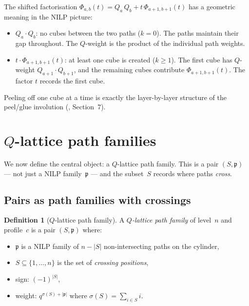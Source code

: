 \documentclass[11pt]{article}
\theoremstyle{plain}
\theoremstyle{definition}
\newtheorem{definition}[theorem]{Definition}
\begin{document}
The shifted factorisation
$\Phi_{a,b}(t) = Q_a\, Q_b + t\,\Phi_{a+1,b+1}(t)$
has a geometric meaning in the NILP picture:
\begin{itemize}
  \item $Q_a \cdot Q_b$: no cubes between the two paths
    ($k = 0$).  The paths maintain their gap throughout.
    The $Q$-weight is the product of the individual
    path weights.
  \item $t \cdot \Phi_{a+1,b+1}(t)$: at least one cube is
    created ($k \geq 1$).  The first cube has
    $Q$-weight $Q_{a+1} \cdot Q_{b+1}$, and the remaining
    cubes contribute $\Phi_{a+1,b+1}(t)$.  The factor
    $t$ records the first cube.
\end{itemize}
Peeling off one cube at a time is exactly the layer-by-layer
structure of the peel/glue involution
(\cite{LOCAL_RULE}, Section~7).


\section{$Q$-lattice path families}
\label{sec:Q-families}

We now define the central object: a $Q$-lattice path family.
This is a pair $(S, \mathfrak{p})$ --- not just a NILP
family~$\mathfrak{p}$ --- and the subset~$S$ records where
paths \emph{cross}.

\subsection{Pairs as path families with crossings}

\begin{definition}[$Q$-lattice path family]
\label{def:Q-lattice-path}
A \emph{$Q$-lattice path family} of level~$n$ and
profile~$c$ is a pair $(S, \mathfrak{p})$ where:
\begin{itemize}
  \item $\mathfrak{p}$ is a NILP family of $n - |S|$
    non-intersecting paths on the cylinder,
  \item $S \subseteq \{1, \ldots, n\}$ is the set of
    \emph{crossing positions},
  \item sign: $(-1)^{|S|}$,
  \item weight: $q^{\sigma(S) + |\mathfrak{p}|}$ where
    $\sigma(S) = \sum_{i \in S} i$.
\end{itemize}
\end{definition}
\end{document}
